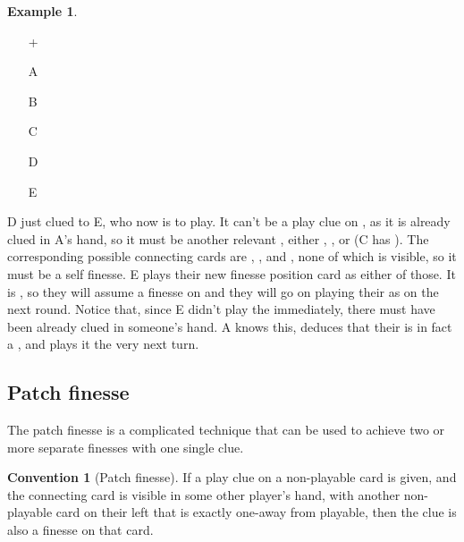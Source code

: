 \documentclass[a4paper]{article}
\theoremstyle{plain}
\theoremstyle{definition}
\newtheorem{example}[theorem]{Example}
\newtheorem{convention}[theorem]{Convention}
\begin{document}
\begin{example}	\hfill \\
	\begin{minipage}{0.45\textwidth}
		\begin{itemize}
			\item[\Large +]      
			\item[\Large A]    
			\item[\Large B]    
			\item[\Large C]    
			\item[\Large D]    
			\item[\Large E]    
		\end{itemize}
	\end{minipage}%
	\begin{minipage}{0.55\textwidth}
		D just clued  to E, who now is to play. It can't be a play clue on , as it is already clued in A's hand, so it must be another relevant , either , , or  (C has ). The corresponding possible connecting cards are , , and , none of which is visible, so it must be a self finesse. E plays their new finesse position card as either of those. It is , so they will assume a finesse on  and they will go on playing their  as  on the next round. Notice that, since E didn't play the  immediately, there must have been  already clued in someone's hand. A knows this, deduces that their  is in fact a , and plays it the very next turn.
	\end{minipage}
\end{example} \vspace{0.15 cm}

\subsection{Patch finesse}

The patch finesse is a complicated technique that can be used to achieve two or more separate finesses with one single clue.

\begin{convention}[Patch finesse]
	\label{patch-finesse}
	If a play clue on a non-playable card is given, and the connecting card is visible in some other player's hand, with another non-playable card on their left that is exactly one-away from playable, then the clue is also a finesse on that card.
\end{convention}
\end{document}
